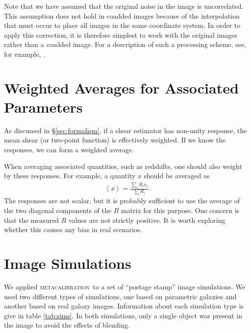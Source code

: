 \documentclass[iop]{emulateapj}
\newcommand{\mcal}{\textsc{metacalibration}}
\begin{document}
Note that we have assumed that the original noise in the image is uncorrelated.
This assumption does not hold in coadded images because of the interpolation
that must occur to place all images in the same coordinate system.  In order to
apply this correction, it is therefore simplest to work with the original
images rather than a coadded image.  For a description of such a processing
scheme, see, for example, \cite{Jarvis2016}.


\section{Weighted Averages for Associated Parameters} \label{sec:weighting}

As discussed in \S \ref{sec:formalism}, if a shear estimator has
non-unity response, the mean shear (or two-point function) is effectively
weighted.  If we know the responses, we can form a weighted average.

When averaging associated quantities, such as redshifts, one should also weight
by these responses.  For example, a quantity $x$ should be averaged as
\begin{align}
    \left< x \right> = \frac{\sum_i R_i x_i}{\sum R_i}.
\end{align}
The responses are not scalar, but it is probably sufficient
to use the average of the two diagonal components of the $R$ matrix
for this purpose. One concern is that the measured $R$ values are not
strictly positive.  It is worth exploring whether this causes
any bias in real scenarios.

\section{Image Simulations} \label{sec:sims}

We applied \mcal\ to a set of ``postage stamp'' image simulations.  We used two
different types of simulations, one based on parametric galaxies and another
based on real galaxy images.  Information about each simulation type is give in
table \ref{tab:sims}.  In both simulations, only a single object was present
in the image to avoid the effects of blending.
\end{document}
